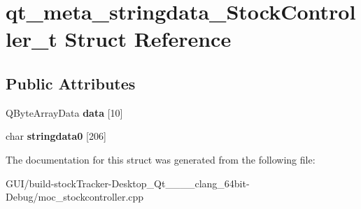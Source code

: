 \hypertarget{structqt__meta__stringdata___stock_controller__t}{}\section{qt\+\_\+meta\+\_\+stringdata\+\_\+\+Stock\+Controller\+\_\+t Struct Reference}
\label{structqt__meta__stringdata___stock_controller__t}
\subsection*{Public Attributes}
\begin{DoxyCompactItemize}
\item 
\mbox{\label{structqt__meta__stringdata___stock_controller__t_a5d9786a9cb0ffffb36565c0a36f8a1c8}} 
Q\+Byte\+Array\+Data {\bfseries data} \mbox{[}10\mbox{]}
\item 
\mbox{\label{structqt__meta__stringdata___stock_controller__t_a4d2438620ea24f0e02c39f07eeed9f89}} 
char {\bfseries stringdata0} \mbox{[}206\mbox{]}
\end{DoxyCompactItemize}


The documentation for this struct was generated from the following file\+:\begin{DoxyCompactItemize}
\item 
G\+U\+I/build-\/stock\+Tracker-\/\+Desktop\+\_\+\+Qt\+\_\+\_\+\_\+\_\+clang\+\_\+64bit-\/\+Debug/moc\+\_\+stockcontroller.\+cpp\end{DoxyCompactItemize}
